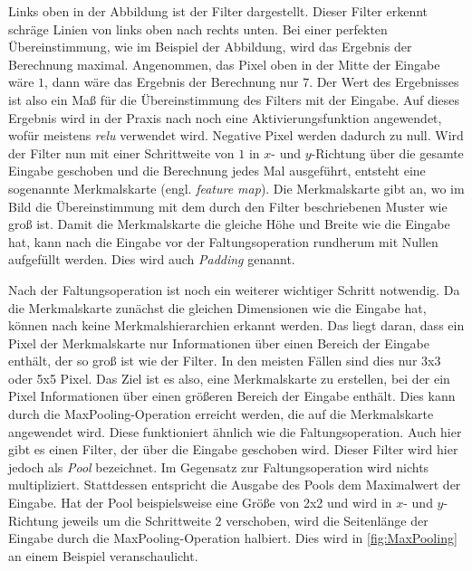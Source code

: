 Links oben in der Abbildung ist der Filter dargestellt.
Dieser Filter erkennt schräge Linien von links oben nach rechts unten.
Bei einer perfekten Übereinstimmung, wie im Beispiel der Abbildung, wird das Ergebnis der Berechnung maximal.
Angenommen, das Pixel oben in der Mitte der Eingabe wäre $1$, dann wäre das Ergebnis der Berechnung nur $7$.
Der Wert des Ergebnisses ist also ein Maß für die Übereinstimmung des Filters mit der Eingabe.
Auf dieses Ergebnis wird in der Praxis nach \cite{6S191CNN} noch eine Aktivierungsfunktion angewendet, wofür meistens \emph{\acrshort{relu}} verwendet wird.
Negative Pixel werden dadurch zu null.
Wird der Filter nun mit einer Schrittweite von $1$ in $x$- und $y$-Richtung über die gesamte Eingabe geschoben und die Berechnung jedes Mal ausgeführt, entsteht eine sogenannte Merkmalskarte (engl. \emph{feature map}).
Die Merkmalskarte gibt an, wo im Bild die Übereinstimmung mit dem durch den Filter beschriebenen Muster wie groß ist.
Damit die Merkmalskarte die gleiche Höhe und Breite wie die Eingabe hat, kann nach \cite[S. 168 f.]{DeepLearningPythonKeras} die Eingabe vor der Faltungsoperation rundherum mit Nullen aufgefüllt werden.
Dies wird auch \emph{Padding} genannt.

Nach der Faltungsoperation ist noch ein weiterer wichtiger Schritt notwendig.
Da die Merkmalskarte zunächst die gleichen Dimensionen wie die Eingabe hat, können nach \cite[S. 171]{DeepLearningPythonKeras} keine Merkmalshierarchien erkannt werden.
Das liegt daran, dass ein Pixel der Merkmalskarte nur Informationen über einen Bereich der Eingabe enthält, der so groß ist wie der Filter.
In den meisten Fällen sind dies nur 3x3 oder 5x5 Pixel.
Das Ziel ist es also, eine Merkmalskarte zu erstellen, bei der ein Pixel Informationen über einen größeren Bereich der Eingabe enthält.
Dies kann durch die MaxPooling-Operation erreicht werden, die auf die Merkmalskarte angewendet wird.
Diese funktioniert ähnlich wie die Faltungsoperation.
Auch hier gibt es einen Filter, der über die Eingabe geschoben wird.
Dieser Filter wird hier jedoch als \emph{Pool} bezeichnet.
Im Gegensatz zur Faltungsoperation wird nichts multipliziert.
Stattdessen entspricht die Ausgabe des Pools dem Maximalwert der Eingabe.
Hat der Pool beispielsweise eine Größe von 2x2 und wird in $x$- und $y$-Richtung jeweils um die Schrittweite $2$ verschoben, wird die Seitenlänge der Eingabe durch die MaxPooling-Operation halbiert.
Dies wird in \autoref{fig:MaxPooling} an einem Beispiel veranschaulicht.

